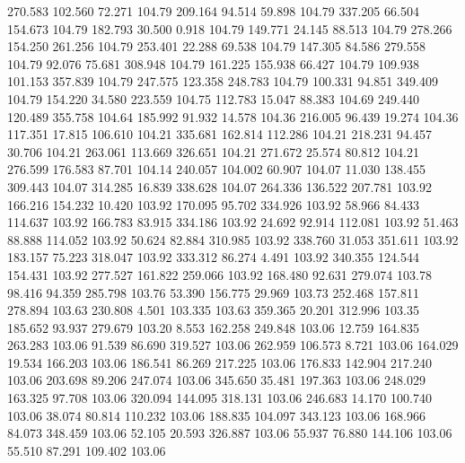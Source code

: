  270.583  102.560   72.271       104.79
 209.164   94.514   59.898       104.79
 337.205   66.504  154.673       104.79
 182.793   30.500    0.918       104.79
 149.771   24.145   88.513       104.79
 278.266  154.250  261.256       104.79
 253.401   22.288   69.538       104.79
 147.305   84.586  279.558       104.79
  92.076   75.681  308.948       104.79
 161.225  155.938   66.427       104.79
 109.938  101.153  357.839       104.79
 247.575  123.358  248.783       104.79
 100.331   94.851  349.409       104.79
 154.220   34.580  223.559       104.75
 112.783   15.047   88.383       104.69
 249.440  120.489  355.758       104.64
 185.992   91.932   14.578       104.36
 216.005   96.439   19.274       104.36
 117.351   17.815  106.610       104.21
 335.681  162.814  112.286       104.21
 218.231   94.457   30.706       104.21
 263.061  113.669  326.651       104.21
 271.672   25.574   80.812       104.21
 276.599  176.583   87.701       104.14
 240.057  104.002   60.907       104.07
  11.030  138.455  309.443       104.07
 314.285   16.839  338.628       104.07
 264.336  136.522  207.781       103.92
 166.216  154.232   10.420       103.92
 170.095   95.702  334.926       103.92
  58.966   84.433  114.637       103.92
 166.783   83.915  334.186       103.92
  24.692   92.914  112.081       103.92
  51.463   88.888  114.052       103.92
  50.624   82.884  310.985       103.92
 338.760   31.053  351.611       103.92
 183.157   75.223  318.047       103.92
 333.312   86.274    4.491       103.92
 340.355  124.544  154.431       103.92
 277.527  161.822  259.066       103.92
 168.480   92.631  279.074       103.78
  98.416   94.359  285.798       103.76
  53.390  156.775   29.969       103.73
 252.468  157.811  278.894       103.63
 230.808    4.501  103.335       103.63
 359.365   20.201  312.996       103.35
 185.652   93.937  279.679       103.20
   8.553  162.258  249.848       103.06
  12.759  164.835  263.283       103.06
  91.539   86.690  319.527       103.06
 262.959  106.573    8.721       103.06
 164.029   19.534  166.203       103.06
 186.541   86.269  217.225       103.06
 176.833  142.904  217.240       103.06
 203.698   89.206  247.074       103.06
 345.650   35.481  197.363       103.06
 248.029  163.325   97.708       103.06
 320.094  144.095  318.131       103.06
 246.683   14.170  100.740       103.06
  38.074   80.814  110.232       103.06
 188.835  104.097  343.123       103.06
 168.966   84.073  348.459       103.06
  52.105   20.593  326.887       103.06
  55.937   76.880  144.106       103.06
  55.510   87.291  109.402       103.06
